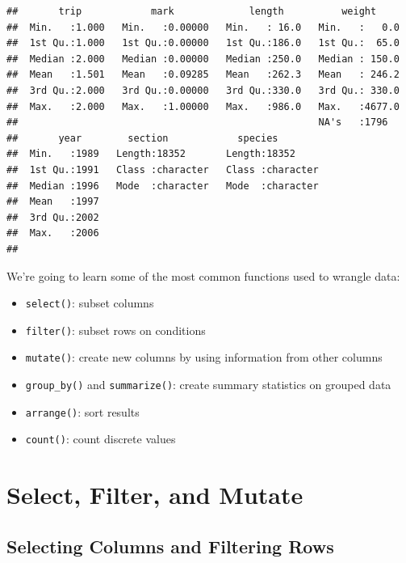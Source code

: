 \documentclass[
  10pt,
  letterpaper,
  twoside,
  openright]{book}
\providecommand{\tightlist}{%
  \setlength{\itemsep}{0pt}\setlength{\parskip}{0pt}}
\begin{document}
\begin{verbatim}
##       trip            mark             length          weight      
##  Min.   :1.000   Min.   :0.00000   Min.   : 16.0   Min.   :   0.0  
##  1st Qu.:1.000   1st Qu.:0.00000   1st Qu.:186.0   1st Qu.:  65.0  
##  Median :2.000   Median :0.00000   Median :250.0   Median : 150.0  
##  Mean   :1.501   Mean   :0.09285   Mean   :262.3   Mean   : 246.2  
##  3rd Qu.:2.000   3rd Qu.:0.00000   3rd Qu.:330.0   3rd Qu.: 330.0  
##  Max.   :2.000   Max.   :1.00000   Max.   :986.0   Max.   :4677.0  
##                                                    NA's   :1796    
##       year        section            species         
##  Min.   :1989   Length:18352       Length:18352      
##  1st Qu.:1991   Class :character   Class :character  
##  Median :1996   Mode  :character   Mode  :character  
##  Mean   :1997                                        
##  3rd Qu.:2002                                        
##  Max.   :2006                                        
## 
\end{verbatim}

We're going to learn some of the most common functions used to wrangle
data:

\begin{itemize}
\tightlist
\item
  \texttt{select()}: subset columns
\item
  \texttt{filter()}: subset rows on conditions
\item
  \texttt{mutate()}: create new columns by using information from other
  columns
\item
  \texttt{group\_by()} and \texttt{summarize()}: create summary
  statistics on grouped data
\item
  \texttt{arrange()}: sort results
\item
  \texttt{count()}: count discrete values
\end{itemize}

\hypertarget{select-filter-and-mutate}{%
\section{Select, Filter, and Mutate}\label{select-filter-and-mutate}}

\hypertarget{selecting-columns-and-filtering-rows}{%
\subsection{Selecting Columns and Filtering
Rows}\label{selecting-columns-and-filtering-rows}}
\end{document}
